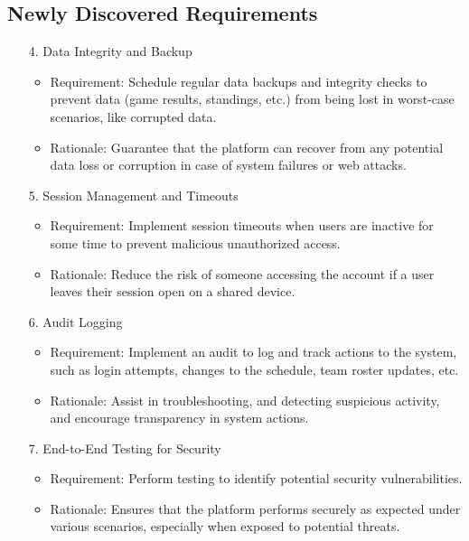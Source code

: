 \documentclass{article}
\begin{document}
\subsection{Newly Discovered Requirements}
\begin{enumerate}
    \item[4.] Data Integrity and Backup
        \begin{itemize}
            \item Requirement: Schedule regular data backups and integrity checks to prevent data (game results, standings, etc.)  from being lost in worst-case scenarios, like corrupted data.
            \item Rationale: Guarantee that the platform can recover from any potential data loss or corruption in case of system failures or web attacks.
        \end{itemize}
    \item[5.] Session Management and Timeouts
        \begin{itemize}
            \item Requirement: Implement session timeouts when users are inactive for some time to prevent malicious unauthorized access.
            \item Rationale: Reduce the risk of someone accessing the account if a user leaves their session open on a shared device.
        \end{itemize}
    \item[6.] Audit Logging
        \begin{itemize}
            \item Requirement: Implement an audit to log and track actions to the system, such as login attempts, changes to the schedule, team roster updates, etc.
            \item Rationale: Assist in troubleshooting, and detecting suspicious activity, and encourage transparency in system actions.
        \end{itemize}
    \item[7.] End-to-End Testing for Security
        \begin{itemize}
            \item Requirement: Perform testing to identify potential security vulnerabilities.
            \item Rationale: Ensures that the platform performs securely as expected under various scenarios, especially when exposed to potential threats.
        \end{itemize}
\end{enumerate}
\end{document}
